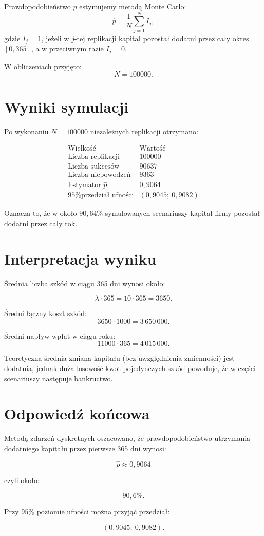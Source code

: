 \documentclass[12pt,a4paper]{article}
\newcommand{\sekcjazwstep}[2]{%
  \Needspace{10\baselineskip}%
  \section*{#1}%
  \nopagebreak[4]%
  #2%
}
\begin{document}
Prawdopodobieństwo $p$ estymujemy metodą Monte Carlo:
\[
\hat{p}=\frac{1}{N}\sum_{j=1}^{N} I_j,
\]
gdzie $I_j=1$, jeżeli w $j$-tej replikacji kapitał pozostał dodatni przez cały
okres $[0,365]$, a w przeciwnym razie $I_j=0$.

W obliczeniach przyjęto:
\[
N=100000.
\]

\sekcjazwstep{Wyniki symulacji}{%
Po wykonaniu $N=100000$ niezależnych replikacji otrzymano:
}

\[
\begin{array}{l|r}
\text{Wielkość} & \text{Wartość}\\
\hline
\text{Liczba replikacji} & 100000\\
\text{Liczba sukcesów} & 90637\\
\text{Liczba niepowodzeń} & 9363\\
\text{Estymator } \hat{p} & 0{,}9064\\
\text{95\% przedział ufności} & (0{,}9045;\ 0{,}9082)
\end{array}
\]

Oznacza to, że w około $90{,}64\%$ symulowanych scenariuszy kapitał firmy
pozostał dodatni przez cały rok.

\sekcjazwstep{Interpretacja wyniku}{%
Średnia liczba szkód w ciągu 365 dni wynosi około:
}
\[
\lambda \cdot 365 = 10 \cdot 365 = 3650.
\]

Średni łączny koszt szkód:
\[
3650 \cdot 1000 = 3\,650\,000.
\]

Średni napływ wpłat w ciągu roku:
\[
11000 \cdot 365 = 4\,015\,000.
\]

Teoretyczna średnia zmiana kapitału (bez uwzględnienia zmienności) jest dodatnia,
jednak duża losowość kwot pojedynczych szkód powoduje, że w części scenariuszy
następuje bankructwo.

\sekcjazwstep{Odpowiedź końcowa}{%
Metodą zdarzeń dyskretnych oszacowano, że prawdopodobieństwo utrzymania dodatniego
kapitału przez pierwsze 365 dni wynosi:
}

\[
\boxed{\hat{p}\approx 0{,}9064}
\]

czyli około:

\[
\boxed{90{,}6\%}.
\]

Przy $95\%$ poziomie ufności można przyjąć przedział:

\[
\boxed{(0{,}9045;\ 0{,}9082)}.
\]
\end{document}

